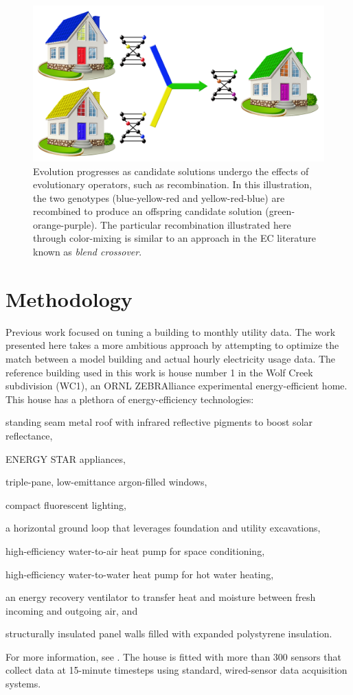 \documentclass[preprint, review, 12pt]{elsarticle}
\begin{document}
\begin{figure}[htbp]
\centering
\includegraphics[width=5in]{graphics/autotune_crossover}
\caption{Evolution progresses as candidate solutions undergo the effects of evolutionary operators, such as recombination. In this illustration, the two genotypes (blue-yellow-red and yellow-red-blue) are recombined to produce an offspring candidate solution (green-orange-purple). The particular recombination illustrated here through color-mixing is similar to an approach in the EC literature known as \emph{blend crossover}.}
\label{fig:crossover}
\end{figure}


\section{Methodology}
\label{sec:methodology}
Previous work \cite{cit:garrett2013} focused on tuning a building to monthly utility data. The work presented here takes a more ambitious approach by attempting to optimize the match between a model building and actual hourly electricity usage data. The reference building used in this work is house number 1 in the Wolf Creek subdivision (WC1), an ORNL ZEBRAlliance experimental energy-efficient home. This house has a plethora of energy-efficiency technologies: 
\begin{inparaenum}[(1)]
\item standing seam metal roof with infrared reflective pigments to boost solar reflectance,
\item ENERGY STAR appliances, 
\item triple-pane, low-emittance argon-filled windows, 
\item compact fluorescent lighting, 
\item a horizontal ground loop that leverages foundation and utility excavations, 
\item high-efficiency water-to-air heat pump for space conditioning, 
\item high-efficiency water-to-water heat pump for hot water heating, 
\item an energy recovery ventilator to transfer heat and moisture between fresh incoming and outgoing air, and 
\item structurally insulated panel walls filled with expanded polystyrene insulation.
\end{inparaenum}
For more information, see \cite{cit:miller2012,cit:biswas2012}. The house is fitted with more than 300 sensors that collect data at 15-minute timesteps using standard, wired-sensor data acquisition systems.
\end{document}
